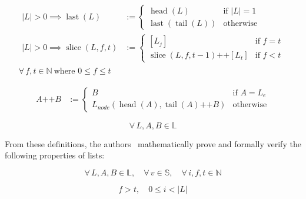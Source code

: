 \begin{equation*}
\begin{gathered}
\begin{aligned}
|L| > 0 \implies \operatorname{last}(L) &:=
\begin{cases}
\operatorname{head}(L) & \text{if } |L| = 1 \\
\operatorname{last}(\operatorname{tail}(L)) & \text{otherwise}
\end{cases} \\
|L| > 0 \implies \operatorname{slice}(L,f,t) &:=
\begin{cases}
[L_j] & \text{if } f = t \\
\operatorname{slice}(L,f,t-1) \mathbin{\texttt{++}} [L_t]
  & \text{if } f < t
\end{cases}
\end{aligned}
\\[0.5ex]
\forall\, f,t \in \mathbb{N}\ \text{where } 0 \leq f \leq t
\end{gathered}
\end{equation*}

\begin{equation*}
\begin{aligned}
A \mathbin{\texttt{++}} B &:=
\begin{cases}
B & \text{if } A = L_e \\
L_{node}(\operatorname{head}(A),
  \operatorname{tail}(A) \mathbin{\texttt{++}} B) & \text{otherwise}
\end{cases}
\end{aligned}
\end{equation*}

\begin{equation*}
\forall\, L,A,B \in \mathbb{L}
\end{equation*}

From these definitions, the authors~\cite{mata2026lists} mathematically prove
and formally verify the following properties of lists:

\begin{equation*}
\forall\, L,A,B \in \mathbb{L},\quad
\forall\, v \in \mathbb{S},\quad
\forall\, i,f,t \in \mathbb{N}
\end{equation*}

\begin{equation*}
f > t,\quad 0 \leq i < |L|
\end{equation*}

